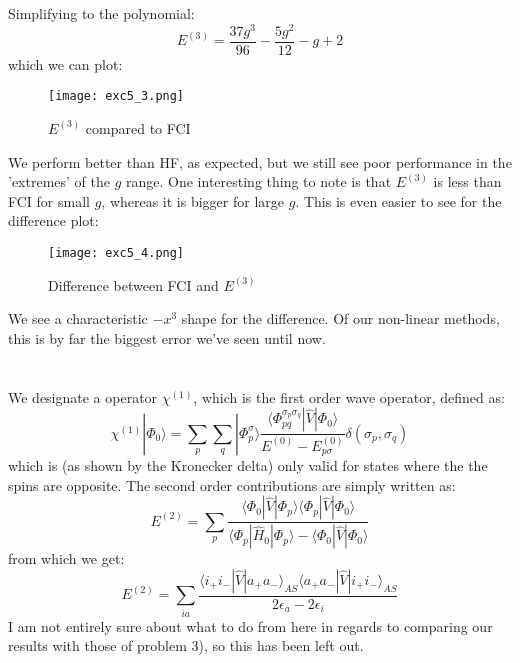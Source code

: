 \documentclass{article}
\begin{document}
Simplifying to the polynomial:
\begin{equation}
    E^{(3)} = \frac{37g^3}{96} - \frac{5g^2}{12} - g + 2
\end{equation}
which we can plot:
\newpage
\begin{figure}[ht!]
    \centering
    \texttt{[image: exc5\_3.png]}
    \caption{$E^{(3)}$ compared to FCI}
    \label{fig:enter-label}
\end{figure}
We perform better than HF, as expected, but we still see poor performance in the 'extremes' of the $g$ range. One interesting thing to note is that $E^{(3)}$ is less than FCI for small $g$, whereas it is bigger for large $g$. This is even easier to see for the difference plot:
\begin{figure}[ht!]
    \centering
    \texttt{[image: exc5\_4.png]}
    \caption{Difference between FCI and $E^{(3)}$}
    \label{fig:enter-label}
\end{figure}
\newline
We see a characteristic $-x^3$ shape for the difference. Of our non-linear methods, this is by far the biggest error we've seen until now.
\newpage
\section{}
We designate a operator $\chi^{(1)}$, which is the first order wave operator, defined as:
\begin{equation*}
    \chi^{(1)}|\Phi_0\rangle = \sum_{p} \sum_{q} |\Phi_p^\sigma \rangle \frac{\langle \Phi_{p q}^{\sigma_p \sigma_q} | \hat V | \Phi_0 \rangle}{E^{(0)} - E_{p\sigma}^{(0)}} \delta(\sigma_p, \sigma_q)
\end{equation*}
which is (as shown by the Kronecker delta) only valid for states where the the spins are opposite. \newline
The second order contributions are simply written as:
\begin{equation*}
    E^{(2)} = \sum_p \frac{\langle \Phi_0 | \hat V | \Phi_p \rangle \langle \Phi_p | \hat V | \Phi_0 \rangle}{\langle \Phi_p | \hat H_0 | \Phi_p \rangle - \langle \Phi_0 | \hat V | \Phi_0 \rangle}
\end{equation*}
from which we get:
\begin{equation*}
    E^{(2)} = \sum_{ia} \frac{\langle i_+ i_- | \hat V | a_+ a_- \rangle_{AS} \langle a_+a_-| \hat V | i_+ i_- \rangle_{AS}}{2\epsilon_a - 2\epsilon_i}
\end{equation*}
\newline
I am not entirely sure about what to do from here in regards to comparing our results with those of problem 3), so this has been left out.
\end{document}

